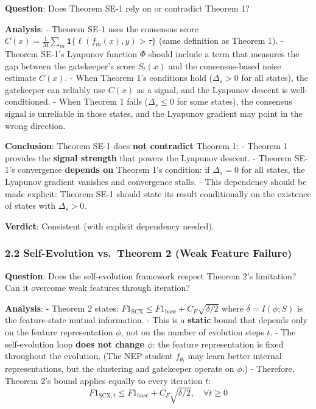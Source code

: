 \documentclass[
  12pt,
]{article}
\begin{document}
\textbf{Question}: Does Theorem SE-1 rely on or contradict Theorem 1?

\textbf{Analysis}: - Theorem SE-1 uses the consensus score
\(C(x) = \frac{1}{M}\sum_m \mathbf{1}\{\ell(f_m(x), y) > \tau\}\) (same
definition as Theorem 1). - Theorem SE-1's Lyapunov function \(\Phi\)
should include a term that measures the gap between the gatekeeper's
score \(S_t(x)\) and the consensus-based noise estimate \(C(x)\). - When
Theorem 1's conditions hold (\(\Delta_s > 0\) for all states), the
gatekeeper can reliably use \(C(x)\) as a signal, and the Lyapunov
descent is well-conditioned. - When Theorem 1 fails (\(\Delta_s \leq 0\)
for some states), the consensus signal is unreliable in those states,
and the Lyapunov gradient may point in the wrong direction.

\textbf{Conclusion}: Theorem SE-1 does \textbf{not contradict} Theorem
1: - Theorem 1 provides the \textbf{signal strength} that powers the
Lyapunov descent. - Theorem SE-1's convergence \textbf{depends on}
Theorem 1's condition: if \(\Delta_s = 0\) for all states, the Lyapunov
gradient vanishes and convergence stalls. - This dependency should be
made explicit: Theorem SE-1 should state its result conditionally on the
existence of states with \(\Delta_s > 0\).

\textbf{Verdict}: Consistent (with explicit dependency needed).

\subsubsection{2.2 Self-Evolution vs.~Theorem 2 (Weak Feature
Failure)}\label{self-evolution-vs.-theorem-2-weak-feature-failure}

\textbf{Question}: Does the self-evolution framework respect Theorem 2's
limitation? Can it overcome weak features through iteration?

\textbf{Analysis}: - Theorem 2 states:
\(F1_{\text{SCX}} \leq F1_{\text{base}} + C_F\sqrt{\delta/2}\) where
\(\delta = I(\phi; S)\) is the feature-state mutual information. - This
is a \textbf{static} bound that depends only on the feature
representation \(\phi\), not on the number of evolution steps \(t\). -
The self-evolution loop \textbf{does not change \(\phi\)}: the feature
representation is fixed throughout the evolution. (The NEP student
\(f_{\theta_t}\) may learn better internal representations, but the
clustering and gatekeeper operate on \(\phi\).) - Therefore, Theorem 2's
bound applies equally to every iteration \(t\):
\[F1_{\text{SCX}, t} \leq F1_{\text{base}} + C_F\sqrt{\delta/2}, \quad \forall t \geq 0\]
\end{document}
